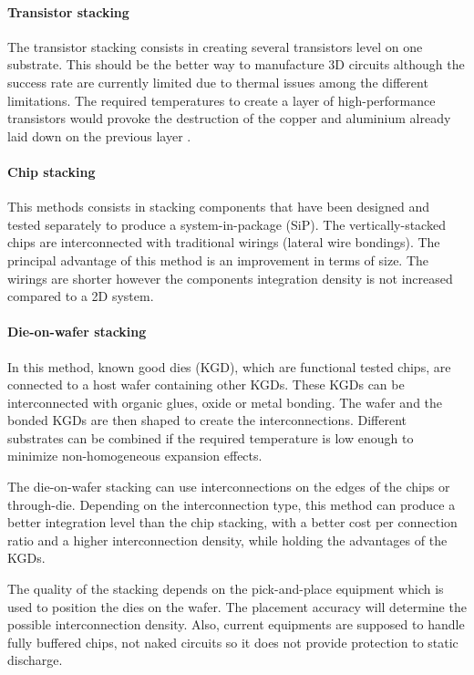 \paragraph{Transistor stacking}

The transistor stacking consists in creating several transistors level on one substrate. This should be the better way to manufacture 3D circuits although the success rate are currently limited due to thermal issues among the different limitations. The required temperatures to create a layer of high-performance transistors would provoke the destruction of the copper and aluminium already laid down on the previous layer \cite{659500}.

\paragraph{Chip stacking}

This methods consists in stacking components that have been designed and tested separately to produce a system-in-package (SiP). The vertically-stacked chips are interconnected with traditional wirings (lateral wire bondings). The principal advantage of this method is an improvement in terms of size. The wirings are shorter however the components integration density is not increased compared to a 2D system.

\paragraph{Die-on-wafer stacking}

In this method, known good dies (KGD), which are functional tested chips, are connected to a host wafer containing other KGDs. These KGDs can be interconnected with organic glues, oxide or metal bonding. The wafer and the bonded KGDs are then shaped to create the interconnections. Different substrates can be combined if the required temperature is low enough to minimize non-homogeneous expansion effects.

The die-on-wafer stacking can use interconnections on the edges of the chips or through-die. Depending on the interconnection type, this method can produce a better integration level than the chip stacking, with a better cost per connection ratio and a higher interconnection density, while holding the advantages of the KGDs.

The quality of the stacking depends on the pick-and-place equipment which is used to position the dies on the wafer. The placement accuracy will determine the possible interconnection density. Also, current equipments are supposed to handle fully buffered chips, not naked circuits so it does not provide protection to static discharge. 

